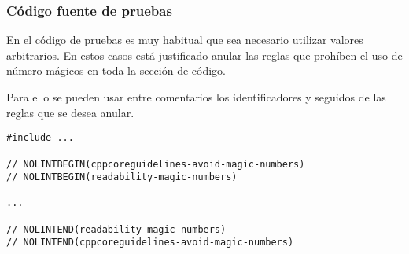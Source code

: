 \subsubsection{Código fuente de pruebas}

En el código de pruebas es muy habitual que sea necesario utilizar valores
arbitrarios. En estos casos está justificado anular las reglas que prohíben el
uso de número mágicos en toda la sección de código.

Para ello se pueden usar entre comentarios los identificadores
 y  
seguidos de las reglas que se desea anular.

\begin{lstlisting}
#include ...

// NOLINTBEGIN(cppcoreguidelines-avoid-magic-numbers)
// NOLINTBEGIN(readability-magic-numbers)

...

// NOLINTEND(readability-magic-numbers)
// NOLINTEND(cppcoreguidelines-avoid-magic-numbers)
\end{lstlisting}
